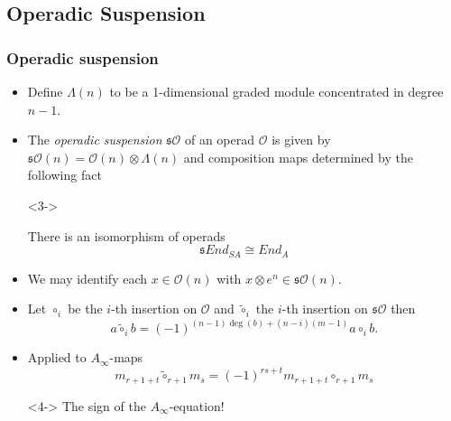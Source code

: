 \documentclass{beamer}
\theoremstyle{definition}
\begin{document}
\subsection{Operadic Suspension}
\begin{frame}
\frametitle{Operadic suspension}
\begin{itemize}
\item<1-> Define $\Lambda(n)$ to be a 1-dimensional graded module concentrated in degree $n-1$.
\item<2-> The \emph{operadic suspension} $\mathfrak{s}\mathcal{O}$ of an operad $\mathcal{O}$ is given by $\mathfrak{s}\mathcal{O}(n)=\mathcal{O}(n)\otimes \Lambda(n)$ and composition maps determined by the following fact %
\item[]<3->
\begin{theorem}[Markl]
There is an isomorphism of operads
\[ \mathfrak{s}End_{S A}\cong End_A\]
\end{theorem}
\end{itemize}
\end{frame}

\begin{frame}
\begin{itemize}

\item<1-> We may identify each $x\in\mathcal{O}(n)$ with $x\otimes e^n\in \mathfrak{s}\mathcal{O}(n)$.
\item<2-> Let $\circ_i$ be the $i$-th insertion on $\mathcal{O}$ and $\tilde{\circ}_i$ the $i$-th insertion on $\mathfrak{s}\mathcal{O}$ then
\[a\tilde{\circ}_ib=(-1)^{(n-1)\deg(b)+(n-i)(m-1)}a\circ_i b.\]
\item<3-> Applied to $A_\infty$-maps 
\[m_{r+1+t}\tilde{\circ}_{r+1}m_s=(-1)^{rs+t}m_{r+1+t}\circ_{r+1}m_s\]
\item[]<4-> The sign of the $A_\infty$-equation!
\end{itemize}
\end{frame}
\end{document}
